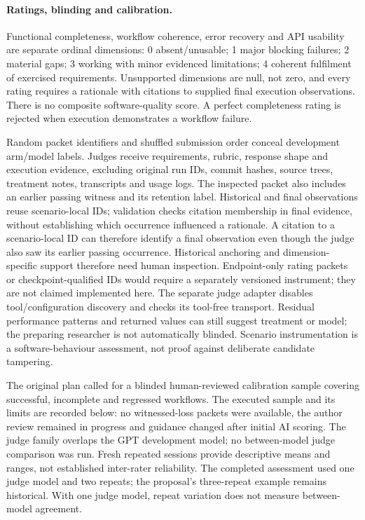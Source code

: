 \paragraph{Ratings, blinding and calibration.}
Functional completeness, workflow coherence, error recovery and API
usability are separate ordinal dimensions: 0 absent/unusable; 1 major
blocking failures; 2 material gaps; 3 working with minor evidenced
limitations; 4 coherent fulfilment of exercised requirements.
Unsupported dimensions are null, not zero, and every rating requires a
rationale with citations to supplied final execution observations.
There is no composite software-quality score. A perfect completeness
rating is rejected when execution demonstrates a workflow failure.

Random packet identifiers and shuffled submission order conceal development
arm/model labels. Judges receive requirements, rubric, response shape
and execution evidence, excluding original run IDs, commit hashes,
source trees, treatment notes, transcripts and usage logs.
The inspected packet also includes an earlier passing witness and its
retention label. Historical and final observations reuse scenario-local
IDs; validation checks citation membership in final evidence, without
establishing which occurrence influenced a rationale. A citation to a
scenario-local ID can therefore identify a final observation even though
the judge also saw its earlier passing occurrence. Historical anchoring
and dimension-specific support therefore need human inspection.
Endpoint-only rating packets or checkpoint-qualified IDs would require
a separately versioned instrument; they are not claimed implemented here.
The separate judge adapter disables tool/configuration discovery and
checks its tool-free transport. Residual performance patterns and returned
values can still suggest treatment or model; the preparing researcher is
not automatically blinded. Scenario instrumentation is a software-behaviour
assessment, not proof against deliberate candidate tampering.

The original plan called for a blinded human-reviewed calibration sample
covering successful, incomplete and regressed workflows. The executed
sample and its limits are recorded below: no witnessed-loss packets were
available, the author review remained in progress and guidance changed
after initial AI scoring. The judge family overlaps the GPT development model; no between-model
judge comparison was run. Fresh repeated
sessions provide descriptive means and ranges, not established inter-rater
reliability. The completed assessment used one judge model and two repeats;
the proposal's three-repeat example remains historical. With one judge
model, repeat variation does not measure between-model agreement.

